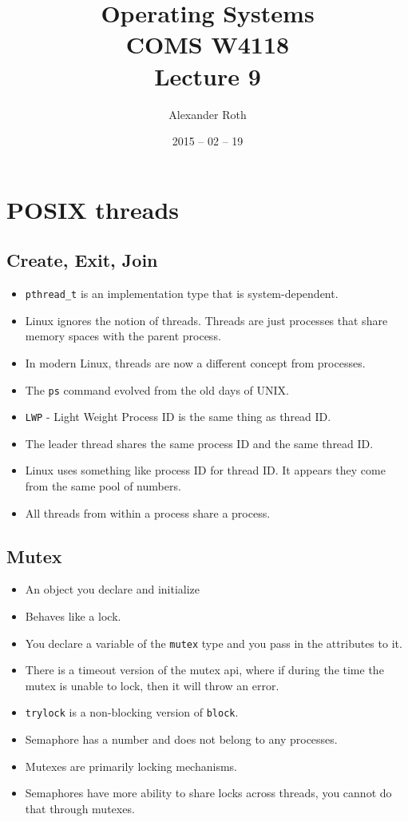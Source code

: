 \documentclass[]{article}
\begin{document}
\newcommand{\code}{\texttt}
\newtheorem{thm}{Theorem}
\title{Operating Systems \\ COMS W4118 \\ Lecture 9}
\author{Alexander Roth}
\date{2015 -- 02 -- 19}
\maketitle

\section{POSIX threads}
\subsection{Create, Exit, Join}
\begin{itemize}
\item \code{pthread\_t} is an implementation type that is system-dependent.
\item Linux ignores the notion of threads. Threads are just processes that share
memory spaces with the parent process.
\item In modern Linux, threads are now a different concept from processes.
\item The \code{ps} command evolved from the old days of UNIX.
\item \code{LWP} - Light Weight Process ID is the same thing as thread ID.
\item The leader thread shares the same process ID and the same thread ID.
\item Linux uses something like process ID for thread ID. It appears they come
from the same pool of numbers.
\item All threads from within a process share a process.
\end{itemize}

\subsection{Mutex}
\begin{itemize}
\item An object you declare and initialize
\item Behaves like a lock.
\item You declare a variable of the \code{mutex} type and you pass in the
attributes to it.
\item There is a timeout version of the mutex api, where if during the time the
mutex is unable to lock, then it will throw an error.
\item \code{trylock} is a non-blocking version of \code{block}.
\item Semaphore has a number and does not belong to any processes.
\item Mutexes are primarily locking mechanisms.
\item Semaphores have more ability to share locks across threads, you cannot do
that through mutexes.
\end{itemize}
\end{document}
